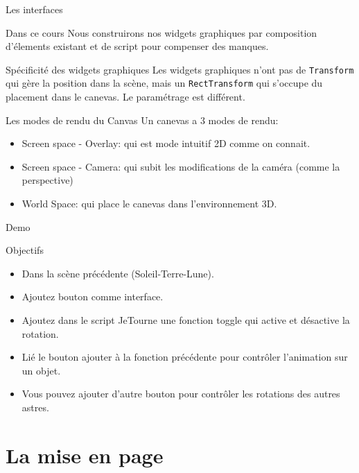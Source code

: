 \begin{frame}{Les interfaces}
	\vfill
\begin{block}{Dans ce cours}
	Nous construirons nos widgets graphiques par composition d'élements existant et de script pour compenser des manques.
\end{block}
\vfill
\begin{block}{Spécificité des widgets graphiques}
	Les widgets graphiques n'ont pas de \texttt{Transform} qui gère la position dans la scène, mais un \texttt{RectTransform} qui s'occupe du placement dans le canevas. Le paramétrage est différent.
\end{block}
\vfill

\begin{block}{Les modes de rendu du Canvas}
	Un canevas a 3 modes de rendu:
	\begin{itemize}
		\item Screen space - Overlay: qui est mode intuitif 2D comme on connait.
		\item Screen space - Camera: qui subit les modifications de la caméra (comme la perspective)
		\item World Space: qui place le canevas dans l'environnement 3D.
	\end{itemize}
\end{block}

\end{frame}


\begin{frame}{Demo}
	\vfill
	\begin{block}{Objectifs}
		\begin{itemize}
			\item Dans la scène précédente (Soleil-Terre-Lune).
			\item Ajoutez bouton comme interface.
			\item Ajoutez dans le script JeTourne une fonction toggle qui active et désactive la rotation.
			\item Lié le bouton ajouter à la fonction précédente pour contrôler l'animation sur un objet.
			\item Vous pouvez ajouter d'autre bouton pour contrôler les rotations des autres astres.
		\end{itemize}
	\end{block}
	\vfill
	
\end{frame}

\section{La mise en page}

